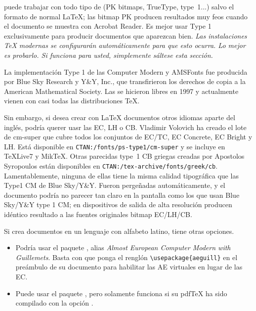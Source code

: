  puede trabajar con todo tipo de \fontsnomo{} (PK bitmaps, TrueType, \PSi{} type~1...) salvo el formato de \fontnomo{} normal \LaTeX{}; las \fontsnomo{} bitmap PK producen resultados muy feos cuando el documento se muestra con Acrobat Reader.  Es mejor usar \fontsnomo{} \PSi{} Type 1 exclusivamente para producir documentos que aparezcan bien.  \emph{Las instalaciones TeX modernas se configurarán automáticamente para que esto ocurra.  Lo mejor es probarlo.  Si funciona para usted, simplemente sáltese esta sección.}

La implementación \PSi{} Type 1 de las \fontsnomo{} Computer Modern y AMSFonts fue producida por Blue Sky Research y Y\&Y, Inc., que transfirieron los derechos de copia a la American Mathematical Society. Las \fontsnomo{} se hicieron libres en 1997 y actualmente vienen con casi todas las distribuciones \TeX{}.

Sin embargo, si desea crear con \LaTeX{} documentos otros idiomas aparte del inglés, podría querer uasr las \fontsnomo{}  EC, LH o CB. Vladimir Volovich ha creado el lote de \fontsnomo{} cm-super que cubre todos los conjuntos de \fontsnomo{} EC/TC, EC Concrete, EC Bright y LH. Está disponible en \texttt{CTAN:/fonts/ps-type1/cm-super} y se incluye en \TeX{}Live7 y Mik\TeX.  Otras \fontsnomo{} parecidas type~1 CB griegas creadas por Apostolos Syropoulos están disponibles en \texttt{CTAN:/tex-archive/fonts/greek/cb}.  Lamentablemente, ninguna de ellas tiene la misma calidad tipográfica que las \fontsnomo{} Type1 CM de Blue Sky/Y\&Y.  Fueron pergeñadas automáticamente, y el documento podría no parecer tan claro en la pantalla como los que usan \fontsnomo{} Blue Sky/Y\&Y type 1 CM; en dispositivos de salida de alta resolución producen idéntico resultado a las fuentes originales bitmap EC/LH/CB.

Si crea documentos en un lenguaje con alfabeto latino, tiene otras opciones.
\begin{itemize}
    \item Podría usar el paquete , alias \emph{Almost European Computer Modern with Guillemets}.  Basta con que ponga el renglón \newline \verb+\usepackage{aeguill}+  en el preámbulo de su documento para habilitar las \fontsnomo{} AE virtuales en lugar de las \fontsnomo{} EC.
    \item Puede usar el paquete , pero solamente funciona si su  pdf\TeX{} ha sido compilado con la opción .
\end{itemize}

